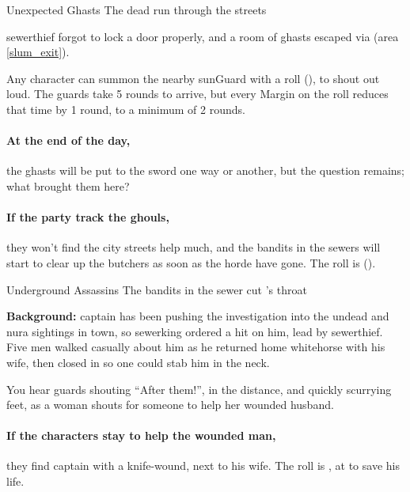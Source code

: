 \warningbard

{Unexpected Ghasts}%
{The dead run through the streets}%

\Gls{sewerthief} forgot to lock a door properly, and a room of ghasts escaped via  (area \vref{slum_exit}).




Any character can summon the nearby \gls{sunGuard} with a  roll (\tn[7]), to shout out loud.
The guards take 5 rounds to arrive, but every Margin on the roll reduces that time by 1 round, to a minimum of 2 rounds.

\paragraph{At the end of the day,}
the ghasts will be put to the sword one way or another, but the question remains; what brought them here?

\paragraph{If the party track the ghouls,}
they won't find the city streets help much, and the bandits in the sewers will start to clear up the butchers as soon as the horde have gone.
The roll is  (\tn[14]).

{Underground Assassins}%
{The bandits in the sewer cut 's throat}%

\textbf{Background:}
\Gls{captain} has been pushing the investigation into the undead and nura sightings in town, so \gls{sewerking} ordered a hit on him, lead by \gls{sewerthief}.
Five men walked casually about him as he returned home \gls{whitehorse} with his wife, then closed in so one could stab him in the neck.

\begin{boxtext}

  You hear guards shouting ``After them!'', in the distance, and quickly scurrying feet, as a woman shouts for someone to help her wounded husband.

\end{boxtext}

\paragraph{If the characters stay to help the wounded man,}
they find \gls{captain} with a knife-wound, next to his wife.
The roll is , at \tn[9] to save his life.

